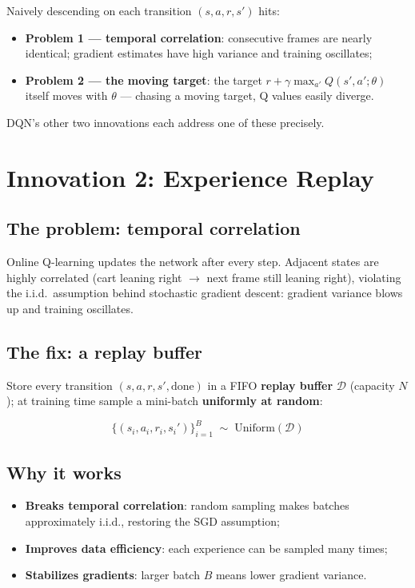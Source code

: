 \documentclass{article}
\begin{document}
Naively descending on each transition $(s, a, r, s')$ hits:
\begin{itemize}
  \item \textbf{Problem 1 --- temporal correlation}: consecutive frames are nearly identical; gradient estimates have high variance and training oscillates;
  \item \textbf{Problem 2 --- the moving target}: the target $r + \gamma\max_{a'}Q(s',a';\theta)$ itself moves with $\theta$ --- chasing a moving target, Q values easily diverge.
\end{itemize}

DQN's other two innovations each address one of these precisely.

\section*{Innovation 2: Experience Replay}

\subsection*{The problem: temporal correlation}

Online Q-learning updates the network after every step. Adjacent states are highly correlated (cart leaning right $\to$ next frame still leaning right), violating the i.i.d.\ assumption behind stochastic gradient descent: gradient variance blows up and training oscillates.

\subsection*{The fix: a replay buffer}

Store every transition $(s, a, r, s', \mathrm{done})$ in a FIFO \textbf{replay buffer} $\mathcal{D}$ (capacity $N$); at training time sample a mini-batch \textbf{uniformly at random}:

\[
\boxed{\{(s_i, a_i, r_i, s_i')\}_{i=1}^{B} \;\sim\; \mathrm{Uniform}(\mathcal{D})}
\]

\subsection*{Why it works}

\begin{itemize}
  \item \textbf{Breaks temporal correlation}: random sampling makes batches approximately i.i.d., restoring the SGD assumption;
  \item \textbf{Improves data efficiency}: each experience can be sampled many times;
  \item \textbf{Stabilizes gradients}: larger batch $B$ means lower gradient variance.
\end{itemize}
\end{document}
